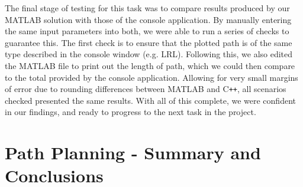 The final stage of testing for this task was to compare results produced by our MATLAB solution with those of the console application. By manually entering the same input parameters into both, we were able to run a series of checks to guarantee this. The first check is to ensure that the plotted path is of the same type described in the console window (e.g. LRL). Following this, we also edited the MATLAB file to print out the length of path, which we could then compare to the total provided by the console application. Allowing for very small margins of error due to rounding differences between MATLAB and C\texttt{++}, all scenarios checked presented the same results. With all of this complete, we were confident in our findings, and ready to progress to the next task in the project.

\section{Path Planning - Summary and Conclusions}
\label{task1:summary}
